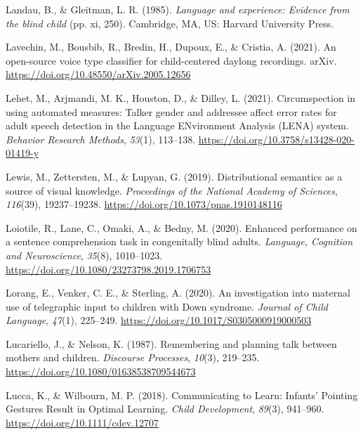 \documentclass[
  man]{apa6}
\newlength{\cslhangindent}
\newlength{\cslentryspacingunit} %
\newenvironment{CSLReferences}[2] %
 {%
  \setlength{\parindent}{0pt}
  \ifodd #1
  \let\oldpar\par
  \def\par{\hangindent=\cslhangindent\oldpar}
  \fi
  \setlength{\parskip}{#2\cslentryspacingunit}
 }%
 {}
\begin{document}
\begin{CSLReferences}{1}{0}
\leavevmode{}%
Landau, B., \& Gleitman, L. R. (1985). \emph{Language and experience: {Evidence} from the blind child} (pp. xi, 250). {Cambridge, MA, US}: {Harvard University Press}.

\leavevmode{}%
Lavechin, M., Bousbib, R., Bredin, H., Dupoux, E., \& Cristia, A. (2021). An open-source voice type classifier for child-centered daylong recordings. {arXiv}. \url{https://doi.org/10.48550/arXiv.2005.12656}

\leavevmode{}%
Lehet, M., Arjmandi, M. K., Houston, D., \& Dilley, L. (2021). Circumspection in using automated measures: {Talker} gender and addressee affect error rates for adult speech detection in the {Language ENvironment Analysis} ({LENA}) system. \emph{Behavior Research Methods}, \emph{53}(1), 113--138. \url{https://doi.org/10.3758/s13428-020-01419-y}

\leavevmode{}%
Lewis, M., Zettersten, M., \& Lupyan, G. (2019). Distributional semantics as a source of visual knowledge. \emph{Proceedings of the National Academy of Sciences}, \emph{116}(39), 19237--19238. \url{https://doi.org/10.1073/pnas.1910148116}

\leavevmode{}%
Loiotile, R., Lane, C., Omaki, A., \& Bedny, M. (2020). Enhanced performance on a sentence comprehension task in congenitally blind adults. \emph{Language, Cognition and Neuroscience}, \emph{35}(8), 1010--1023. \url{https://doi.org/10.1080/23273798.2019.1706753}

\leavevmode{}%
Lorang, E., Venker, C. E., \& Sterling, A. (2020). An investigation into maternal use of telegraphic input to children with {Down} syndrome. \emph{Journal of Child Language}, \emph{47}(1), 225--249. \url{https://doi.org/10.1017/S0305000919000503}

\leavevmode{}%
Lucariello, J., \& Nelson, K. (1987). Remembering and planning talk between mothers and children. \emph{Discourse Processes}, \emph{10}(3), 219--235. \url{https://doi.org/10.1080/01638538709544673}

\leavevmode{}%
Lucca, K., \& Wilbourn, M. P. (2018). Communicating to {Learn}: {Infants}' {Pointing Gestures Result} in {Optimal Learning}. \emph{Child Development}, \emph{89}(3), 941--960. \url{https://doi.org/10.1111/cdev.12707}


\end{CSLReferences}
\end{document}
